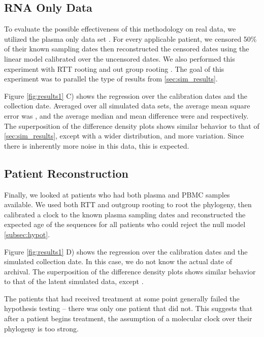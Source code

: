 \subsection{RNA Only Data} \label{sec:rna_only}
To evaluate the possible effectiveness of this methodology on real data, we utilized the plasma only data set \citep{McCloskey14}. For every applicable patient, we censored 50\% of their known sampling dates then reconstructed the censored dates using the linear model calibrated over the uncensored dates. We also performed this experiment with RTT rooting and out group rooting . The goal of this experiment was to parallel the type of results from \ref{sec:sim_results}.

Figure \ref{fig:results1} C) shows the regression over the calibration dates and the collection date. Averaged over all simulated data sets, the average mean square error was , and the average median and mean difference were  and  respectively. The superposition of the difference density plots shows similar behavior to that of \ref{sec:sim_results}, except with a wider distribution, and more variation. Since there is inherently more noise in this data, this is expected. 

\subsection{Patient Reconstruction}
Finally, we looked at patients who had both plasma and PBMC samples available. We used both RTT and outgroup rooting to root the phylogeny, then calibrated a clock to the known plasma sampling dates and reconstructed the expected age of the sequences for all patients who could reject the null model \ref{subsec:hypot}. 

Figure \ref{fig:results1} D) shows the regression over the calibration dates and the simulated collection date. In this case, we do not know the actual date of archival.  The superposition of the difference density plots shows similar behavior to that of the latent simulated data, except .  

The patients that had received treatment at some point generally failed the hypothesis testing -- there was only one patient that did not. This suggests that after a patient begins treatment, the assumption of a molecular clock over their phylogeny is too strong. 

